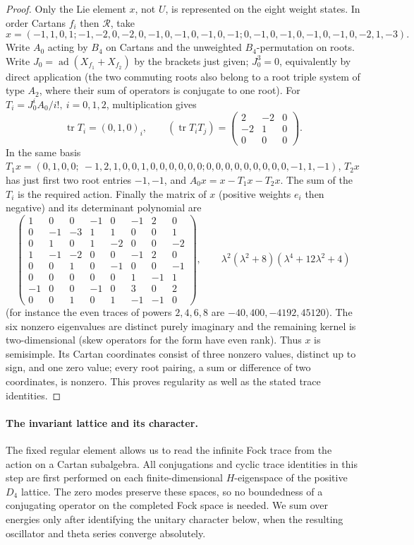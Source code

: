 \begin{proof}
Only the Lie element \(x\), not \(U\), is represented on the eight
weight states. In order Cartans \(f_i\) then \(\mathcal R\), take
\[
 x=(-1,1,0,1; -1,-2,0,-2,0,-1,0,-1,0,-1,0,-1; 0,-1,0,-1,0,-1,0,-1,0,-2,1,-3).
\]
Write \(A_0\) acting by \(B_4\) on Cartans and the unweighted \(B_4\)-permutation on roots. Write \(J_0=\operatorname{ad}(X_{f_1}+X_{f_2})\) by the brackets just given; \(J_0^3=0\), equivalently by direct application (the two commuting roots also belong to a root triple system of type \(A_2\), where their sum of operators is conjugate to one root). For \(T_i=J_0^i A_0/i!,\ i=0,1,2\), multiplication gives
\[
 \operatorname{tr}T_i=(0,1,0)_i,\qquad
 (\operatorname{tr}T_iT_j)=\begin{pmatrix}2&-2&0\\-2&1&0\\0&0&0\end{pmatrix}.
\]
In the same basis \(T_1x=(0,1,0,0;\ -1,2,1,0,0,1,0,0,0,0,0,0; 0,0,0,0,0,0,0,0,0,-1,1,-1)\),
\(T_2x\) has just first two root entries \(-1,-1\), and \(A_0 x=x-T_1x-T_2x\). The sum of the \(T_i\) is the required action. Finally the matrix of \(x\) (positive weights \(e_i\) then negative) and its determinant polynomial are
\[
 \begin{pmatrix}
1&0&0&-1&0&-1&2&0\\
0&-1&-3&1&1&0&0&1\\
0&1&0&1&-2&0&0&-2\\
1&-1&-2&0&0&-1&2&0\\
0&0&1&0&-1&0&0&-1\\
0&0&0&0&0&1&-1&1\\
-1&0&0&-1&0&3&0&2\\
0&0&1&0&1&-1&-1&0
 \end{pmatrix},\qquad
 \lambda^2(\lambda^2+8)(\lambda^4+12\lambda^2+4)
\]
(for instance the even traces of powers \(2,4,6,8\) are \(-40,400,-4192,45120\)). The six nonzero eigenvalues are distinct purely imaginary and the remaining kernel is two-dimensional (skew operators for the form have even rank). Thus \(x\) is semisimple. Its Cartan coordinates consist of three nonzero values, distinct up to sign, and one zero value; every root pairing, a sum or difference of two coordinates, is nonzero. This proves regularity as well as the stated trace identities.
\end{proof}

\paragraph{The invariant lattice and its character.}
The fixed regular element allows us to read the infinite Fock trace from
the action on a Cartan subalgebra. All conjugations and cyclic trace identities in this step are first performed on each finite-dimensional \(H\)-eigenspace of the positive \(D_4\) lattice. The zero modes preserve these spaces, so no boundedness of a conjugating operator on the completed Fock space is needed. We sum over energies only after identifying the unitary character below, when the resulting oscillator and theta series converge absolutely.

